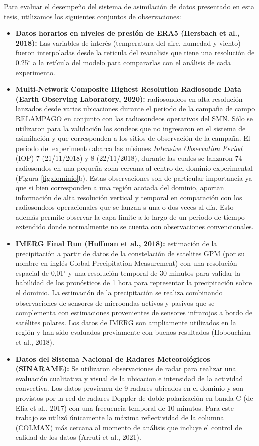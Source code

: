 \documentclass[12pt,oneside,a4paper]{reedthesis}
\begin{document}
Para evaluar el desempeño del sistema de asimilación de datos presentado en esta tesis, utilizamos los siguientes conjuntos de observaciones:
\begin{itemize}
\item
  \textbf{Datos horarios en niveles de presión de ERA5 (Hersbach et al., 2018):} Las variables de interés (temperatura del aire, humedad y viento) fueron interpoladas desde la reticula del reanalisis que tiene una resolución de 0.25\(^{\circ}\) a la retícula del modelo para compararlas con el análisis de cada experimento.
\item
  \textbf{Multi-Network Composite Highest Resolution Radiosonde Data (Earth Observing Laboratory, 2020):} radiosondeos en alta resolución lanzados desde varias ubicaciones durante el periodo de la campaña de campo RELAMPAGO en conjunto con las radiosondeos operativos del SMN. Sólo se utilizaron para la validación los sondeos que no ingresaron en el sistema de asimilación y que corresponden a los sitios de observación de la campaña. El periodo del experimento abarca las misiones \emph{Intensive Observation Period} (IOP) 7 (21/11/2018) y 8 (22/11/2018), durante las cuales se lanzaron 74 radiosondos en una pequeña zona cercana al centro del dominio experimental (Figura \ref{fig:dominio}b). Estas observaciones son de particular importancia ya que si bien corresponden a una región acotada del dominio, aportan información de alta resolución vertical y temporal en comparación con los radiosondeos operacionales que se lanzan s una o dos veces al día. Esto además permite observar la capa límite a lo largo de un periodo de tiempo extendido donde normalmente no se cuenta con observaciones convencionales.
\item
  \textbf{IMERG Final Run (Huffman et al., 2018):} estimación de la precipitación a partir de datos de la constelación de satelites GPM (por su nombre en inglés Global Precipitation Measurement) con una resolución espacial de 0,01\(^{\circ}\) y una resolución temporal de 30 minutos para validar la habilidad de los pronósticos de 1 hora para representar la precipitación sobre el dominio. La estimación de la precipitación se realiza combinando observaciones de sensores de microondas activos y pasivos que se complementa con estimaciones provenientes de sensores infrarojos a bordo de satélites polares. Los datos de IMERG son ampliamente utilizados en la región y han sido evaluados previamente con buenos resultados (Hobouchian et al., 2018).
\item
  \textbf{Datos del Sistema Nacional de Radares Meteorológicos (SINARAME):} Se utilizaron observaciones de radar para realizar una evaluación cualitativa y visual de la ubicacion e intensidad de la actividad convectiva. Los datos provienen de 9 radares ubicados en el dominio y son provistos por la red de radares Doppler de doble polarización en banda C (de Elía et al., 2017) con una frecuencia temporal de 10 minutos. Para este trabajo se utilizó únicamente la máxima reflectividad de la columna (COLMAX) más cercana al momento de análisis que incluye el control de calidad de los datos (Arruti et al., 2021).

\end{itemize}
\end{document}
